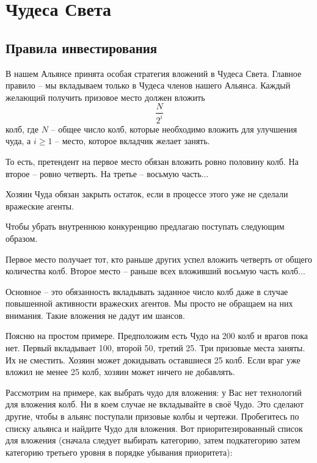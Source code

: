 \section{Чудеса Света}

\subsection{Правила инвестирования}

В нашем Альянсе принята особая стратегия вложений в Чудеса Света.
Главное правило -- мы вкладываем только в Чудеса членов нашего Альянса.
Каждый желающий получить призовое место должен вложить
$$\frac{N}{2^i}$$
колб, где $N$ -- общее число колб, которые необходимо вложить для улучшения чуда, а $i \geqslant 1$ -- место, которое вкладчик желает занять.

То есть, претендент на первое место обязан вложить ровно половину колб. 
На второе -- ровно четверть. 
На третье -- восьмую часть... 

Хозяин Чуда обязан закрыть остаток, если в процессе этого уже не сделали вражеские агенты. 

Чтобы убрать внутреннюю конкуренцию предлагаю поступать следующим образом. 

Первое место получает тот, кто раньше других успел вложить четверть от общего количества колб. 
Второе место -- раньше всех вложивший восьмую часть колб...

Основное -- это обязанность вкладывать заданное число колб даже в случае повышенной активности вражеских агентов. Мы просто не обращаем на них внимания. Такие вложения не дадут им шансов.

Поясню на простом примере. Предположим есть Чудо на 200 колб и врагов пока нет. Первый вкладывает 100, второй 50, третий 25. Три призовые места заняты. Их не сместить. Хозяин может докидывать оставшиеся 25 колб. Если враг уже вложил не менее 25 колб, хозяин может ничего не добавлять.

Рассмотрим на примере, как выбрать чудо для вложения: у Вас нет технологий для вложения колб.
Ни в коем случае не вкладывайте в своё Чудо.
Это сделают другие, чтобы в альянс поступали призовые колбы и чертежи.
Пробегитесь по списку альянса и найдите Чудо для вложения.
Вот приоритезированный список для вложения (сначала следует выбирать категорию, затем подкатегорию затем категорию третьего уровня в порядке убывания приоритета):

